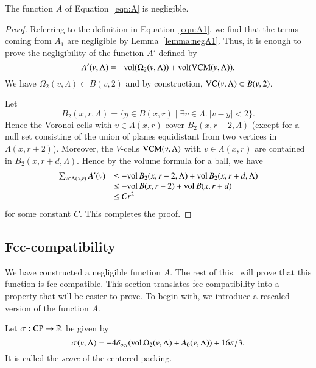 \begin{theorem}\label{lemma:negligible}
The function $A$ of Equation~\ref{eqn:A} is negligible.
\end{theorem}

\begin{proof}   
Referring to the definition in Equation~\ref{eqn:A1}, we find that
the terms coming from $A_1$ are negligible by
Lemma~\ref{lemma:negA1}.  Thus, it is enough to prove the
negligibility of the function $A'$ defined by
      $$
      A'(v,\Lambda) = -{\operatorname{vol}}(\Omega_2(v,\Lambda))+
         {\operatorname{vol}}({\operatorname{VCM}}(v,\Lambda)).$$
We
have $\Omega_2(v,\Lambda)\subset B(v,2)$ and by
construction, 
${\operatorname{VC}}(v,\Lambda)\subset B(v,2)$. 

Let 
  $$
  B_2(x,r,\Lambda) = \{y \in B(x,r)\mid \exists v\in \Lambda.\ 
         |v-y| < 2\}.
  $$
Hence the Voronoi cells with
$v\in \Lambda(x,r)$ cover $B_2(x,r-2,\Lambda)$ (except for a null set
consisting of the union of planes equidistant from two vertices in
$\Lambda(x,r+2)$). Moreover, the $V$-cells ${\operatorname{VCM}}(v,\Lambda)$
with $v\in \Lambda(x,r)$ are contained in $B_2(x,r+d,\Lambda)$.  Hence by
the volume formula for a ball, we have
   $$
   \begin{array}{lll}
   \sum_{v\in\Lambda(x,r)} A'(v) &\le 
     -{\operatorname{vol}}\,B_2(x,r-2,\Lambda)
      +{\operatorname{vol}}\,B_2(x,r+d,\Lambda)\\&\le 
       -{\operatorname{vol}}\,B(x,r-2)
      +{\operatorname{vol}}\,B(x,r+d)\\& \le 
      C r^2
      \end{array}
   $$
for some constant $C$. This completes the proof.
\end{proof}


\subsection{Fcc-compatibility}

We have constructed a negligible function $A$.  The rest of this
\paper\ will prove that this function is fcc-compatible.   This
section translates fcc-compatibility into a property that will be
easier to prove.  To begin with, we introduce a rescaled version
of the function $A$.

\begin{definition}\label{def:score}
Let $\sigma:{\operatorname{CP}}\to\mathbb{R}$ be given by
   $$\sigma(v,\Lambda) = -4\delta_{oct} ({\operatorname{vol}}\,\Omega_2(v,\Lambda) + A_0(v,\Lambda)) +
   16\pi/3.$$
It is called the {\it score} of the centered packing.
%
\end{definition}

